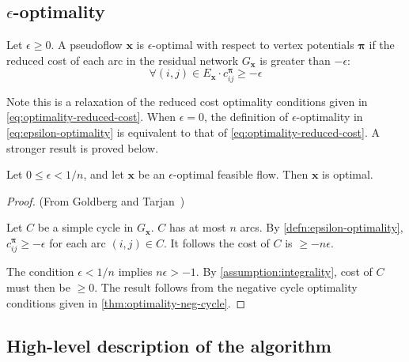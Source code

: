 \subsection{\texorpdfstring{$\epsilon$}{epsilon}-optimality}

\begin{defn}
\label{defn:epsilon-optimality}
Let $\epsilon \geq 0$. A pseudoflow $\mathbf{x}$ is $\epsilon$-optimal with respect to vertex potentials $\boldsymbol{\pi}$ if the reduced cost of each arc in the residual network $G_\mathbf{x}$ is greater than $-\epsilon$:
\begin{equation} \label{eq:epsilon-optimality}
\forall (i,j) \in E_{\mathbf{x}}\cdot c^{\boldsymbol{\pi}}_{ij} \geq -\epsilon
\end{equation}
\end{defn}

\begin{remark}
Note this is a relaxation of the reduced cost optimality conditions given in \cref{eq:optimality-reduced-cost}. When $\epsilon = 0$, the definition of $\epsilon$-optimality in \cref{eq:epsilon-optimality} is equivalent to that of \cref{eq:optimality-reduced-cost}. A stronger result is proved below.\\
\end{remark}

\begin{thm} \label{thm:epsilon-optimality-optimal}
Let $0 \leq \epsilon < 1/n$, and let $\mathbf{x}$ be an $\epsilon$-optimal feasible flow. Then $\mathbf{x}$ is optimal.
\end{thm}
\begin{proof} (From Goldberg and Tarjan~\cite[theorem~3.4]{Goldberg:1987})
    
Let $C$ be a simple cycle in $G_\mathbf{x}$. $C$ has at most $n$ arcs. By \cref{defn:epsilon-optimality}, $c^{\boldsymbol{\pi}}_{ij} \geq -\epsilon$ for each arc $(i,j) \in C$. It follows the cost of $C$ is $\geq -n\epsilon$.

The condition $\epsilon < 1/n$ implies $n\epsilon > -1$. By \cref{assumption:integrality}, cost of $C$ must then be $\geq 0$. The result follows from the negative cycle optimality conditions given in \cref{thm:optimality-neg-cycle}.
\end{proof}

\subsection{High-level description of the algorithm}

